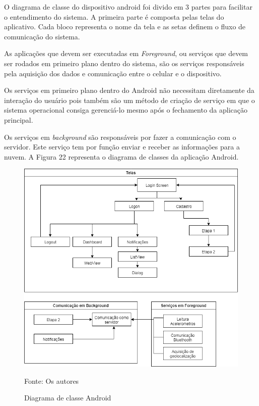 O diagrama de classe do dispositivo android foi divido em 3 partes para facilitar o entendimento do sistema.
A primeira parte é composta pelas telas do aplicativo. Cada bloco representa o nome da tela e as setas definem o fluxo de comunicação do sistema.

As aplicações que devem ser executadas em \textit{Foreground}, ou serviços que devem ser rodados em primeiro plano dentro do sistema, são os serviços responsáveis pela aquisição dos dados e comunicação entre o celular e o dispositivo.

Os serviços em primeiro plano dentro do Android não necessitam diretamente da interação do usuário pois também são um método de criação de serviço em que o sistema operacional consiga gerenciá-lo mesmo após o fechamento da aplicação principal.

Os serviços em \textit{background} são responsáveis por fazer a comunicação com o servidor. Este serviço tem por função enviar e receber as informações para a nuvem. A Figura 22 representa o diagrama de classes da aplicação Android.



\begin{figure}[H]

 \caption{Diagrama de classe Android}
\begin{center}
  \includegraphics[width=150mm]{images/Cap3/Diagrama_de_Classes-Android.png}
  \end{center}
   Fonte: Os autores
    
\end{figure}

